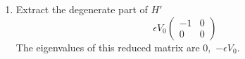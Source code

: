 \begin{enumerate}
\begin{align*}
        =&V_0\begin{pmatrix}
            0 & 0 & 1 
        \end{pmatrix}
        \begin{pmatrix}
            0\\
            \epsilon\\0
        \end{pmatrix} = 0
    \end{align*}
    \begin{align*}
        E_3^2 = &
        \frac{\bigg(\begin{pmatrix}
            1 & 0 & 0 
        \end{pmatrix}
        V_0\begin{pmatrix}
        -\epsilon & 0 & 0\\
        0 & 0 & \epsilon\\
        0 & \epsilon & 0
    \end{pmatrix}
    \begin{pmatrix}
            0 \\ 0 \\ 1 
        \end{pmatrix}
    \bigg)^2}{E_3 - E_1}
    +\frac{\bigg(\begin{pmatrix}
            0 & 1 & 0 
        \end{pmatrix}
        V_0\begin{pmatrix}
        -\epsilon & 0 & 0\\
        0 & 0 & \epsilon\\
        0 & \epsilon & 0
    \end{pmatrix}
    \begin{pmatrix}
            0 \\ 0 \\ 1 
        \end{pmatrix}
    \bigg)^2}{E_3 - E_2}\\
    =&\frac{V_0^2\epsilon^2}{V_0} = \epsilon^2
    \end{align*}
    \item 
    Extract the degenerate part of $H'$
    $$
    \epsilon V_0\begin{pmatrix}
        -1 & 0 \\
        0 & 0
    \end{pmatrix}
    $$
    The eigenvalues of this reduced matrix are 
    $0,$ $-\epsilon V_0.$
    
\end{enumerate}

